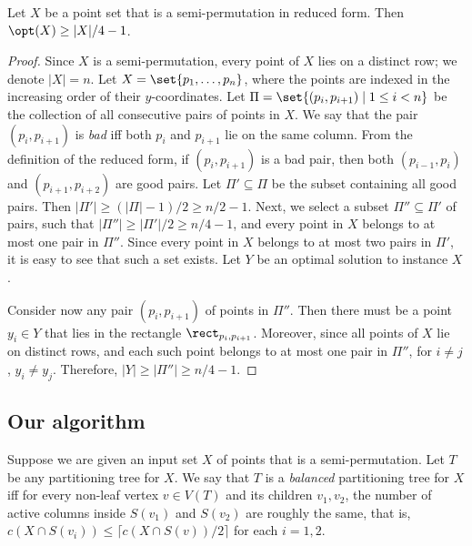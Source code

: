 \begin{lemma}\label{lem: bound on WB for reduced}
        Let $X$ be a point set that is a semi-permutation in reduced form. Then $\opt(X)\geq |X|/4-1$. 
\end{lemma}
\begin{proof}
Since $X$ is a semi-permutation, every point of $X$ lies on a distinct row; we denote $|X|=n$. Let $X=\set{p_1,\ldots,p_n}$, where the points are indexed in the increasing order of their $y$-coordinates. 
Let $\Pi=\set{(p_i,p_{i+1})\mid 1\leq i<n}$ be the collection of all consecutive pairs of points in $X$. We say that the pair $(p_i,p_{i+1})$ is \emph{bad} iff both $p_i$ and $p_{i+1}$ lie on the same column. From the definition of the reduced form, if $(p_i,p_{i+1})$ is a bad pair, then both $(p_{i-1},p_i)$ and $(p_{i+1},p_{i+2})$ are good pairs. Let $\Pi'\subseteq \Pi$ be the subset containing all good pairs. Then $|\Pi'|\geq (|\Pi|-1)/2\geq n/2-1$. Next, we select a subset $\Pi''\subseteq \Pi'$ of pairs, such that $|\Pi''|\geq |\Pi'|/2\geq n/4-1$, and every point in $X$ belongs to at most one pair in $\Pi''$. Since every point in $X$ belongs to at most two pairs in $\Pi'$, it is easy to see that such a set exists. Let $Y$ be an optimal solution to instance $X$.

Consider now any pair $(p_i,p_{i+1})$ of points in $\Pi''$. Then there must be a point $y_i\in Y$ that lies in the rectangle $\rect_{p_i,p_{i+1}}$. Moreover, since all points of $X$ lie on distinct rows, and each such point belongs to at most one pair in $\Pi''$, for $i\neq j$, $y_i\neq y_j$. Therefore, $|Y|\geq |\Pi''|\geq n/4-1$.
\end{proof}





\subsection{Our algorithm} 
\newcommand{\progspace}{\hspace{0.5cm}} 

Suppose we are given an input set $X$ of points that is a semi-permutation. Let $T$ be any partitioning tree for $X$. We say that $T$ is a \emph{balanced} partitioning tree for $X$ iff for every non-leaf vertex $v\in V(T)$ and its children $v_1,v_2$, the number of active columns inside $S(v_1)$ and $S(v_2)$ are roughly the same, that is, $c(X \cap S(v_i)) \leq \lceil c(X\cap S(v))/2 \rceil$ for each $i =1,2$. 

%

